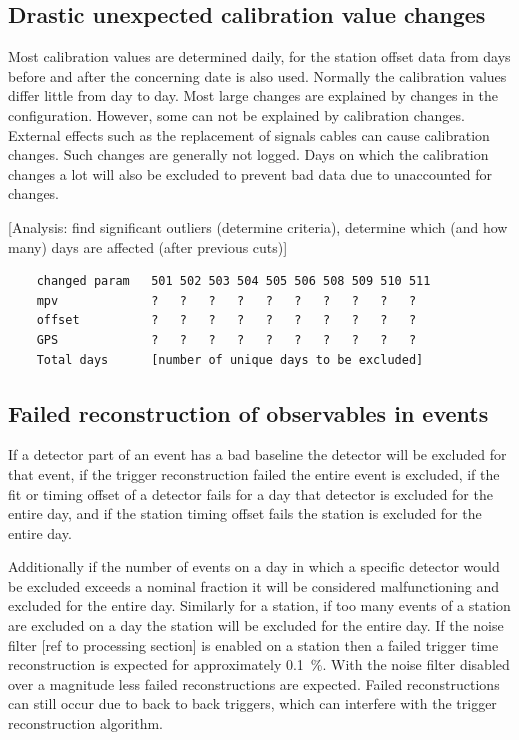 \subsection{Drastic unexpected calibration value changes}

Most calibration values are determined daily, for the station offset data from days before and after the concerning date is also used. Normally the calibration values differ little from day to day. Most large changes are explained by changes in the configuration. However, some can not be explained by calibration changes. External effects such as the replacement of signals cables can cause calibration changes. Such changes are generally not logged. Days on which the calibration changes a lot will also be excluded to prevent bad data due to unaccounted for changes.

[Analysis: find significant outliers (determine criteria), determine which (and how many) days are affected (after previous cuts)]

\begin{verbatim}
    changed param   501 502 503 504 505 506 508 509 510 511
    mpv             ?   ?   ?   ?   ?   ?   ?   ?   ?   ?
    offset          ?   ?   ?   ?   ?   ?   ?   ?   ?   ?
    GPS             ?   ?   ?   ?   ?   ?   ?   ?   ?   ?
    Total days      [number of unique days to be excluded]
\end{verbatim}


\subsection{Failed reconstruction of observables in events}

If a detector part of an event has a bad baseline the detector will be excluded for that event, if the trigger reconstruction failed the entire event is excluded, if the \mpv fit or timing offset of a detector fails for a day that detector is excluded for the entire day, and if the station timing offset fails the station is excluded for the entire day.

Additionally if the number of events on a day in which a specific detector would be excluded exceeds a nominal fraction it will be considered malfunctioning and excluded for the entire day. Similarly for a station, if too many events of a station are excluded on a day the station will be excluded for the entire day. If the noise filter [ref to processing section] is enabled on a station then a failed trigger time reconstruction is expected for approximately \SI{0.1}{\percent}. With the noise filter disabled over a magnitude less failed reconstructions are expected. Failed reconstructions can still occur due to back to back triggers, which can interfere with the trigger reconstruction algorithm.

